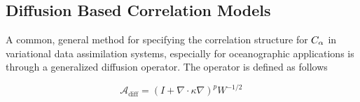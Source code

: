\subsection{Diffusion Based Correlation Models}
\label{ssec:wc01_review}

A common, general method for specifying the correlation structure for
$C_\alpha$ in variational data assimilation systems, especially for
oceanographic applications  is through a generalized diffusion
operator.
The operator is defined as follows
\begin{linenomath*}\begin{equation}
    \mathcal{A}_\text{diff} =
        \left(I + \nabla\cdot\kappa\nabla \right)^p W^{-1/2} \,
\end{equation}\end{linenomath*}



